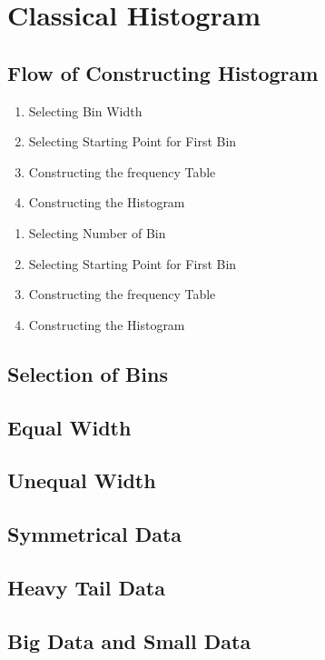 \section{Classical Histogram}
\subsection{Flow of Constructing Histogram}
\begin{enumerate}
	\item Selecting Bin Width
	\item Selecting Starting Point for First Bin
	\item Constructing the frequency Table
	\item Constructing the Histogram
\end{enumerate}

\begin{enumerate}
	\item Selecting Number of Bin
	\item Selecting Starting Point for First Bin
	\item Constructing the frequency Table
	\item Constructing the Histogram
\end{enumerate}
\subsection{Selection of Bins}

\subsection{Equal Width}

\subsection{Unequal Width}

\subsection{Symmetrical Data}

\subsection{Heavy Tail Data}
 
\subsection{Big Data and Small Data}
